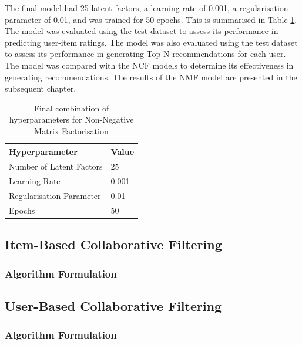 The final model had 25 latent factors, a learning rate of 0.001, a regularisation parameter of 0.01, and was trained for 50 epochs. This is summarised in Table \ref{hyper_params_mf_final}. The model was evaluated using the test dataset to assess its performance in predicting user-item ratings. The model was also evaluated using the test dataset to assess its performance in generating Top-N recommendations for each user. The model was compared with the NCF models to determine its effectiveness in generating recommendations. The results of the NMF model are presented in the subsequent chapter.


\begin{table}[h]
    \centering
    \begin{tabular}{|p{6cm}|p{3cm}|}
    \hline
    \textbf{Hyperparameter} & \textbf{Value}  \\
    \hline
    Number of Latent Factors & 25 \\
    Learning Rate & 0.001 \\
    Regularisation Parameter & 0.01 \\
    Epochs & 50 \\
    \hline
    \end{tabular}
    \caption{Final combination of hyperparameters for Non-Negative Matrix Factorisation}
    \label{hyper_params_mf_final}
    \end{table}



\subsection{Item-Based Collaborative Filtering}
\label{subsec:4 Item-Based Collaborative Filtering}


\subsubsection{Algorithm Formulation}
\label{subsubsec:4 Algorithm Formulation IB}


\subsection{User-Based Collaborative Filtering}
\label{subsec:4 User-Based Collaborative Filtering}


\subsubsection{Algorithm Formulation}
\label{subsubsec:4 Algorithm Formulation UB}


